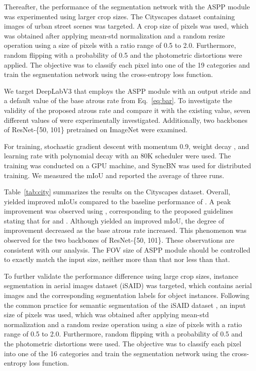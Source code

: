 \documentclass{article}
\def\tabref#1{Table~\ref{#1}}
\def\eqref#1{Eq.~\ref{#1}}
\begin{document}
Thereafter, the performance of the segmentation network with the ASPP module was experimented using larger crop sizes. The Cityscapes dataset \citep{DBLP:conf/cvpr/CordtsORREBFRS16} containing images of urban street scenes was targeted. A crop size of  pixels was used, which was obtained after applying mean-std normalization and a random resize operation using a size of  pixels with a ratio range of 0.5 to 2.0. Furthermore, random flipping with a probability of 0.5 and the photometric distortions were applied. The objective was to classify each pixel into one of the 19 categories and train the segmentation network using the cross-entropy loss function.

We target DeepLabV3 that employs the ASPP module with an output stride  and a default value of the base atrous rate  from \eqref{eq:bar}. To investigate the validity of the proposed atrous rate  and compare it with the existing value, seven different values of  were experimentally investigated. Additionally, two backbones of ResNet-\{50, 101\} pretrained on ImageNet \citep{DBLP:conf/cvpr/DengDSLL009} were examined.

For training, stochastic gradient descent with momentum 0.9, weight decay , and learning rate  with polynomial decay with an 80K scheduler were used. The training was conducted on a  GPU machine, and SyncBN \citep{DBLP:conf/cvpr/0005DSZWTA18} was used for distributed training. We measured the mIoU and reported the average of three runs.

\tabref{tab:city} summarizes the results on the Cityscapes dataset. Overall,  yielded improved mIoUs compared to the baseline performance of . A peak improvement was observed using , corresponding to the proposed guidelines stating that  for  and . Although  yielded an improved mIoU, the degree of improvement decreased as the base atrous rate increased. This phenomenon was observed for the two backbones of ResNet-\{50, 101\}. These observations are consistent with our analysis. The FOV size of ASPP module should be controlled to exactly match the input size, neither more than that nor less than that.

To further validate the performance difference using large crop sizes, instance segmentation in aerial images dataset (iSAID) \citep{DBLP:conf/cvpr/ZamirAGKSK00XB19,DBLP:conf/cvpr/XiaBDZBLDPZ18} was targeted, which contains aerial images and the corresponding segmentation labels for object instances. Following the common practice for semantic segmentation of the iSAID dataset \citep{DBLP:conf/nips/GuoLHLC022}, an input size of  pixels was used, which was obtained after applying mean-std normalization and a random resize operation using a size of  pixels with a ratio range of 0.5 to 2.0. Furthermore, random flipping with a probability of 0.5 and the photometric distortions were used. The objective was to classify each pixel into one of the 16 categories and train the segmentation network using the cross-entropy loss function.
\end{document}
